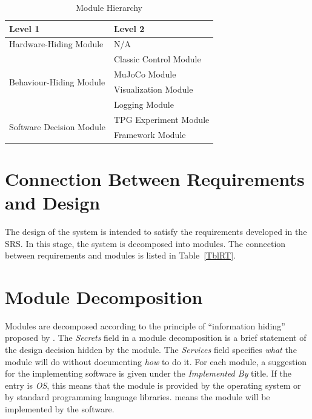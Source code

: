 \documentclass[12pt, titlepage]{article}
\begin{document}
\begin{table}[h!]
\centering
\begin{tabular}{p{} p{}}
\toprule
\textbf{Level 1} & \textbf{Level 2}\\
\midrule

{Hardware-Hiding Module} & N/A \\
\midrule

\multirow{4}{0.3\textwidth}{Behaviour-Hiding Module} & Classic Control Module \\
& MuJoCo Module\\
& Visualization Module\\
& Logging Module\\
\midrule

\multirow{2}{0.3\textwidth}{Software Decision Module} & {TPG Experiment Module}\\
& Framework Module\\
\bottomrule

\end{tabular}
\caption{Module Hierarchy}
\label{TblMH}
\end{table}

\section{Connection Between Requirements and Design} \label{SecConnection}

The design of the system is intended to satisfy the requirements developed in
the SRS. In this stage, the system is decomposed into modules. The connection
between requirements and modules is listed in Table~\ref{TblRT}.

\section{Module Decomposition} \label{SecMD}

Modules are decomposed according to the principle of ``information hiding''
proposed by \citet{ParnasEtAl1984}. The \emph{Secrets} field in a module
decomposition is a brief statement of the design decision hidden by the
module. The \emph{Services} field specifies \emph{what} the module will do
without documenting \emph{how} to do it. For each module, a suggestion for the
implementing software is given under the \emph{Implemented By} title. If the
entry is \emph{OS}, this means that the module is provided by the operating
system or by standard programming language libraries.  \emph{\progname{}} means the
module will be implemented by the \progname{} software.
\end{document}
